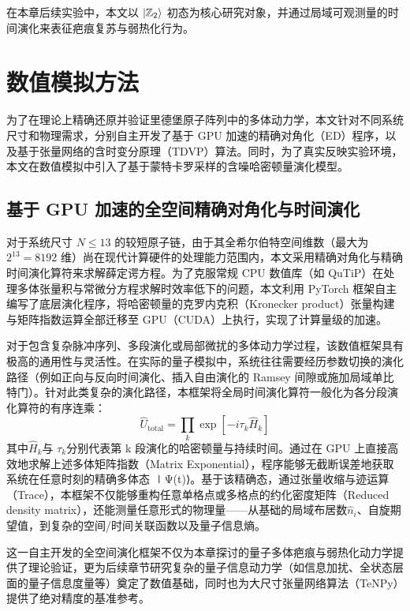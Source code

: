 \documentclass[../main.tex]{subfiles}
\begin{document}
在本章后续实验中，本文以 $\ket{\mathbb{Z}_2}$ 初态为核心研究对象，并通过局域可观测量的时间演化来表征疤痕复苏与弱热化行为。

\section{数值模拟方法}


为了在理论上精确还原并验证里德堡原子阵列中的多体动力学，本文针对不同系统尺寸和物理需求，分别自主开发了基于 GPU 加速的精确对角化（ED）程序，以及基于张量网络的含时变分原理（TDVP）算法。同时，为了真实反映实验环境，本文在数值模拟中引入了基于蒙特卡罗采样的含噪哈密顿量演化模型。

\subsection{基于 GPU 加速的全空间精确对角化与时间演化}

对于系统尺寸 $N \leq 13$ 的较短原子链，由于其全希尔伯特空间维数（最大为 $2^{13}=8192$ 维）尚在现代计算硬件的处理能力范围内，本文采用精确对角化与精确时间演化算符来求解薛定谔方程。为了克服常规 CPU 数值库（如 QuTiP）在处理多体张量积与常微分方程求解时效率低下的问题，本文利用 PyTorch 框架自主编写了底层演化程序，将哈密顿量的克罗内克积（Kronecker product）张量构建与矩阵指数运算全部迁移至 GPU（CUDA）上执行，实现了计算量级的加速。

对于包含复杂脉冲序列、多段演化或局部微扰的多体动力学过程，该数值框架具有极高的通用性与灵活性。在实际的量子模拟中，系统往往需要经历参数切换的演化路径（例如正向与反向时间演化、插入自由演化的 Ramsey 间隙或施加局域单比特门）。针对此类复杂的演化路径，本框架将全局时间演化算符一般化为各分段演化算符的有序连乘： \begin{equation} \hat{U}_\text{total} = \prod_k \exp\left[-i \tau_k \hat{H}_k\right] \end{equation} 其中$\hat{H}_k$与 $\tau_k$分别代表第 k 段演化的哈密顿量与持续时间。通过在 GPU 上直接高效地求解上述多体矩阵指数（Matrix Exponential），程序能够无截断误差地获取系统在任意时刻的精确多体态 ∣Ψ(t)⟩。基于该精确态，通过张量收缩与迹运算（Trace），本框架不仅能够重构任意单格点或多格点的约化密度矩阵（Reduced density matrix），还能测量任意形式的物理量——从基础的局域布居数$\hat{n}_i$、自旋期望值，到复杂的空间/时间关联函数以及量子信息熵。

这一自主开发的全空间演化框架不仅为本章探讨的量子多体疤痕与弱热化动力学提供了理论验证，更为后续章节研究复杂的量子信息动力学（如信息加扰、全状态层面的量子信息度量等）奠定了数值基础，同时也为大尺寸张量网络算法（TeNPy）提供了绝对精度的基准参考。
\end{document}
